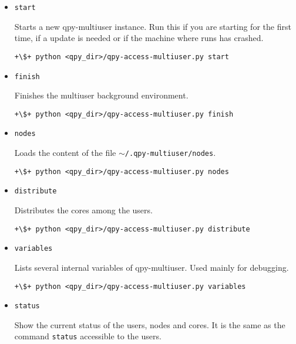 \documentclass[a4paper,12pt]{article}
\begin{document}
\begin{itemize}

\item \texttt{start}
  
  Starts a new qpy-multiuser instance.
  Run this if you are starting \qpy{} for the first time, if a update is needed or if the machine where \qpy{} runs has crashed.
  
  \begin{lstlisting}[style=BashStyle]
+\$+ python <qpy_dir>/qpy-access-multiuser.py start
  \end{lstlisting}

\item \texttt{finish}
  
  Finishes the multiuser background environment.
  \begin{lstlisting}[style=BashStyle]
+\$+ python <qpy_dir>/qpy-access-multiuser.py finish
\end{lstlisting}


\item \texttt{nodes}

  Loads the content of the file \texttt{$\sim$/.qpy-multiuser/nodes}.

  \begin{lstlisting}[style=BashStyle]
+\$+ python <qpy_dir>/qpy-access-multiuser.py nodes
  \end{lstlisting}


\item \texttt{distribute}

  Distributes the cores among the users.

  \begin{lstlisting}[style=BashStyle]
+\$+ python <qpy_dir>/qpy-access-multiuser.py distribute
  \end{lstlisting}

  
\item \texttt{variables}

  Lists several internal variables of qpy-multiuser.
  Used mainly for debugging.

  \begin{lstlisting}[style=BashStyle]
+\$+ python <qpy_dir>/qpy-access-multiuser.py variables
  \end{lstlisting}


\item \texttt{status}

  Show the current status of the users, nodes and cores.
  It is the same as the command \texttt{status} accessible to the users.


\end{itemize}
\end{document}
